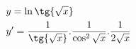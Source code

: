 \begin{ex}
\begin{align}
&y=\ln{\tg{\sqrt{x}}}\nonumber\\
&y'=\frac{1}{\tg{\sqrt{x}}}.\frac{1}{\cos^2{\sqrt{x}}}.\frac{1}{2\sqrt{x}}\nonumber
\end{align}
\end{ex}
